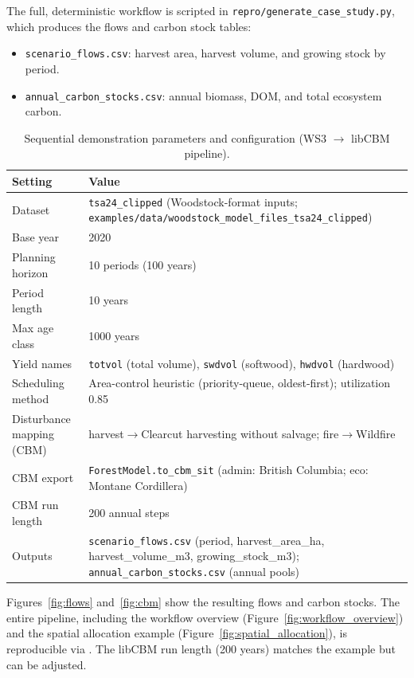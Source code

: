 \documentclass[review]{elsarticle}
\begin{document}
The full, deterministic workflow is scripted in \texttt{repro/generate\_case\_study.py}, which produces the flows and carbon stock tables:
\begin{itemize}
  \item \texttt{scenario\_flows.csv}: harvest area, harvest volume, and growing stock by period.
  \item \texttt{annual\_carbon\_stocks.csv}: annual biomass, DOM, and total ecosystem carbon.
\end{itemize}
\begin{table}[h]
\centering
\caption{Sequential demonstration parameters and configuration (WS3 $\to$ libCBM pipeline).}
\begin{tabular}{p{4.2cm}p{9.5cm}}
\toprule
Setting & Value \\
\midrule
Dataset & \texttt{tsa24\_clipped} (Woodstock-format inputs; \texttt{examples/data/woodstock\_model\_files\_tsa24\_clipped}) \\
Base year & 2020 \\
Planning horizon & 10 periods (100 years) \\
Period length & 10 years \\
Max age class & 1000 years \\
Yield names & \texttt{totvol} (total volume), \texttt{swdvol} (softwood), \texttt{hwdvol} (hardwood) \\
Scheduling method & Area-control heuristic (priority-queue, oldest-first); utilization 0.85 \\
Disturbance mapping (CBM) & harvest$\to$Clearcut harvesting without salvage; fire$\to$Wildfire \\
CBM export & \texttt{ForestModel.to\_cbm\_sit} (admin: British Columbia; eco: Montane Cordillera) \\
CBM run length & 200 annual steps \\
Outputs & \texttt{scenario\_flows.csv} (period, harvest\_area\_ha, harvest\_volume\_m3, growing\_stock\_m3); \texttt{annual\_carbon\_stocks.csv} (annual pools) \\
\bottomrule
\end{tabular}
\label{tab:case_params}
\end{table}

Figures~\ref{fig:flows} and~\ref{fig:cbm} show the resulting flows and carbon stocks. The entire pipeline, including the workflow overview (Figure~\ref{fig:workflow_overview}) and the spatial allocation example (Figure~\ref{fig:spatial_allocation}), is reproducible via . The libCBM run length (200 years) matches the example but can be adjusted.
\end{document}
